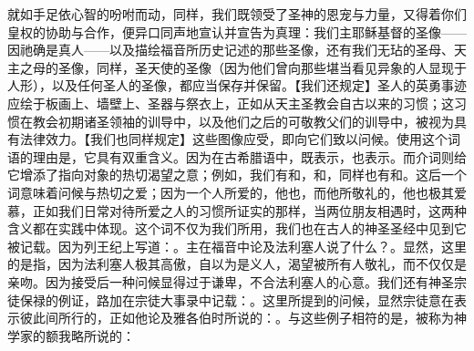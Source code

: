 就如手足依心智的吩咐而动，同样，我们既领受了圣神的恩宠与力量，又得着你们皇权的协助与合作，便异口同声地宣认并宣告为真理：我们主耶稣基督的圣像——因祂确是真人——以及描绘福音所历史记述的那些圣像，还有我们无玷的圣母、天主之母的圣像，同样，圣天使的圣像（因为他们曾向那些堪当看见异象的人显现于人形），以及任何圣人的圣像，都应当保存并保留。\newline{}【我们还规定】圣人的英勇事迹应绘于板画上、墙壁上、圣器与祭衣上，正如从天主圣教会自古以来的习惯；这习惯在教会初期诸圣领袖的训导中，以及他们之后的可敬教父们的训导中，被视为具有法律效力。\newline{}【我们也同样规定】这些图像应受，即向它们致以问候。使用这个词语的理由是，它具有双重含义。因为在古希腊语中，既表示，也表示。而介词则给它增添了指向对象的热切渴望之意；例如，我们有和，和，同样也有和。这后一个词意味着问候与热切之爱；因为一个人所爱的，他也，而他所敬礼的，他也极其爱慕，正如我们日常对待所爱之人的习惯所证实的那样，当两位朋友相遇时，这两种含义都在实践中体现。这个词不仅为我们所用，我们也在古人的神圣圣经中见到它被记载。因为列王纪上写道：。主在福音中论及法利塞人说了什么？。显然，这里的是指，因为法利塞人极其高傲，自以为是义人，渴望被所有人敬礼，而不仅仅是亲吻。因为接受后一种问候显得过于谦卑，不合法利塞人的心意。我们还有神圣宗徒保禄的例证，路加在宗徒大事录中记载：。这里所提到的问候，显然宗徒意在表示彼此间所行的，正如他论及雅各伯时所说的：。与这些例子相符的是，被称为神学家的额我略所说的：\par

